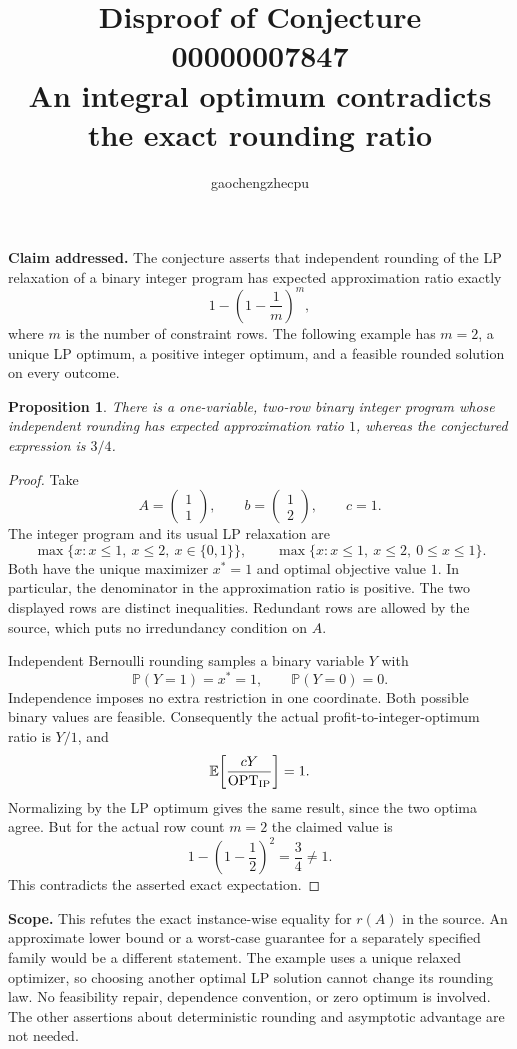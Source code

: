 \documentclass[11pt]{article}
\title{Disproof of Conjecture 00000007847\\An integral optimum contradicts the exact rounding ratio}
\author{gaochengzhecpu}
\date{}
\newtheorem{proposition}{Proposition}
\begin{document}
\maketitle
\noindent\textbf{Claim addressed.} The conjecture asserts that independent rounding of the LP relaxation of a binary integer program has expected approximation ratio exactly
\[
  1-\left(1-\frac1m\right)^m,
\]
where $m$ is the number of constraint rows. The following example has $m=2$, a unique LP optimum, a positive integer optimum, and a feasible rounded solution on every outcome.

\begin{proposition}
There is a one-variable, two-row binary integer program whose independent rounding has expected approximation ratio $1$, whereas the conjectured expression is $3/4$.
\end{proposition}
\begin{proof}
Take
\[
 A=\begin{pmatrix}1\\1\end{pmatrix},\qquad
 b=\begin{pmatrix}1\\2\end{pmatrix},\qquad c=1.
\]
The integer program and its usual LP relaxation are
\[
 \max\{x:x\leq1,\ x\leq2,\ x\in\{0,1\}\},\qquad
 \max\{x:x\leq1,\ x\leq2,\ 0\leq x\leq1\}.
\]
Both have the unique maximizer $x^*=1$ and optimal objective value $1$. In particular, the denominator in the approximation ratio is positive. The two displayed rows are distinct inequalities. Redundant rows are allowed by the source, which puts no irredundancy condition on $A$.

Independent Bernoulli rounding samples a binary variable $Y$ with
\[
 \mathbb P(Y=1)=x^*=1,\qquad \mathbb P(Y=0)=0.
\]
Independence imposes no extra restriction in one coordinate. Both possible binary values are feasible. Consequently the actual profit-to-integer-optimum ratio is $Y/1$, and
\[
 \mathbb E\!\left[\frac{cY}{\operatorname{OPT}_{\rm IP}}\right]=1.
\]
Normalizing by the LP optimum gives the same result, since the two optima agree. But for the actual row count $m=2$ the claimed value is
\[
 1-\left(1-\frac12\right)^2=\frac34\ne1.
\]
This contradicts the asserted exact expectation.
\end{proof}

\noindent\textbf{Scope.} This refutes the exact instance-wise equality for $r(A)$ in the source. An approximate lower bound or a worst-case guarantee for a separately specified family would be a different statement. The example uses a unique relaxed optimizer, so choosing another optimal LP solution cannot change its rounding law. No feasibility repair, dependence convention, or zero optimum is involved. The other assertions about deterministic rounding and asymptotic advantage are not needed.
\end{document}
